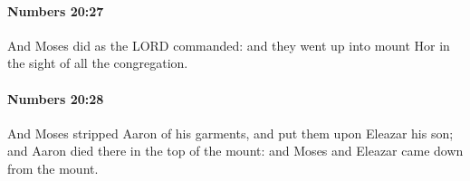 		\paragraph{Numbers 20:27} %
			\label{NUMBERS-20-27}

			And Moses did as the LORD commanded: and they went up into mount Hor in the sight of all the congregation.


		\paragraph{Numbers 20:28} %
			\label{NUMBERS-20-28}

			And Moses stripped Aaron of his garments, and put them upon Eleazar his son; and Aaron died there in the top of the mount: and Moses and Eleazar came down from the mount.


